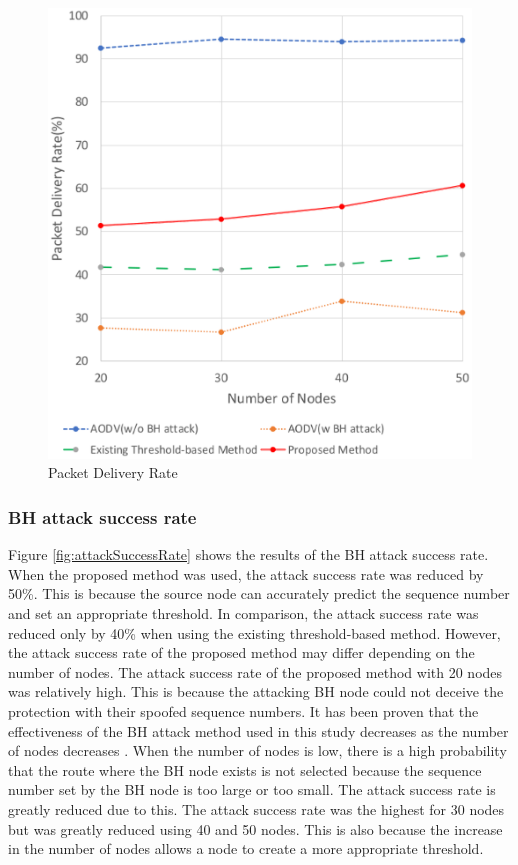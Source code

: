 \documentclass[conference]{IEEEtran}
\begin{document}
\begin{figure}[!htb]
\centering
\includegraphics[scale=0.45]{PDR}
\caption{Packet Delivery Rate}
\label{fig:pdr}
\end{figure}

\subsubsection{BH attack success rate}
Figure \ref{fig:attackSuccessRate}  shows the results of the BH attack success rate. When the proposed method was used, the attack success rate was reduced by 50\%. This is because the source node can accurately predict the sequence number and set an appropriate threshold. In comparison, the attack success rate was reduced only by 40\% when using the existing threshold-based method. However, the attack success rate of the proposed method may differ depending on the number of nodes. The attack success rate of the proposed method with 20 nodes was relatively high. This is because the attacking BH node could not deceive the protection with their spoofed sequence numbers. It has been proven that the effectiveness of the BH attack method used in this study decreases as the number of nodes decreases \cite{8}. When the number of nodes is low, there is a high probability that the route where the BH node exists is not selected because the sequence number set by the BH node is too large or too small. The attack success rate is greatly reduced due to this. The attack success rate was the highest for 30 nodes but was greatly reduced using 40 and 50 nodes. This is also because the increase in the number of nodes allows a node to create a more appropriate threshold.
\end{document}
